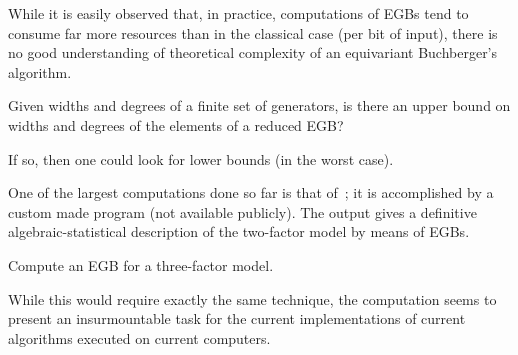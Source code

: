 

While it is easily observed that, in practice, computations of EGBs tend to consume far more resources than in the classical case (per bit of input), there is no good understanding of theoretical complexity of an equivariant Buchberger's algorithm.

\begin{question}
Given widths and degrees of a finite set of generators, is there an upper bound on widths and degrees of the elements of a reduced EGB?

If so, then one could look for lower bounds (in the worst case). 
\end{question}






One of the largest computations done so far is that of~\cite{Brouwer09e}; it is accomplished by a custom made program (not available publicly). The output gives a definitive algebraic-statistical description of the two-factor model by means of EGBs. 

\begin{problem}
Compute an EGB for a three-factor model.
\end{problem} 

While this would require exactly the same technique, the computation seems to present an insurmountable task for the current implementations of current algorithms executed on current computers.
